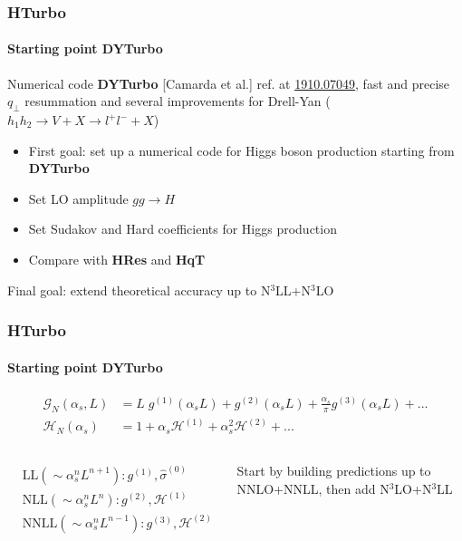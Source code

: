 \documentclass[aspectratio=43]{beamer}
\begin{document}
\begin{frame}

	\frametitle{HTurbo}
	\framesubtitle{Starting point DYTurbo}

	Numerical code \textbf{DYTurbo} {\color{blue}[Camarda et al.]} ref. at {\color{blue} \href{https://arxiv.org/abs/1910.07049}{1910.07049}}, fast and precise $q_{\perp}$ resummation and several improvements for Drell-Yan ($h_{1}h_{2} \rightarrow V + X \rightarrow l^{+}l^{-} + X$) 
	
	\begin{itemize}
		\item {\color{red}First goal}: set up a numerical code for Higgs boson production starting from  \textbf{DYTurbo}
		\item Set LO amplitude $gg \rightarrow H$
		\item Set Sudakov and Hard coefficients for Higgs production
		\item Compare with \textbf{HRes} and \textbf{HqT}
	\end{itemize}

	\vspace{0.5 cm}

	{\color{red}Final goal}: extend theoretical accuracy up to N$^{3}$LL+N$^{3}$LO

\end{frame}

\begin{frame}

	\frametitle{HTurbo}
	\framesubtitle{Starting point DYTurbo}

	\begin{align}
		\mathcal{G}_{N}(\alpha_{s}, L) &= L\;g^{(1)}(\alpha_{s}L) + g^{(2)}(\alpha_{s}L) + \frac{\alpha_{s}}{\pi}g^{(3)}(\alpha_{s}L) + ... \nonumber \\
		\mathcal{H}_{N}(\alpha_{s}) &= 1 + \alpha_{s}\mathcal{H}^{(1)} + \alpha_{s}^{2}\mathcal{H}^{(2)} + ...  \nonumber
	\end{align}
	
	\begin{columns}
		

		\begin{align}
			&\textrm{LL} (\sim \alpha_{s}^{n}L^{n+1}): g^{(1)}, \hat{\sigma}^{(0)} \nonumber \\
			&\textrm{NLL} (\sim \alpha_{s}^{n}L^{n}): g^{(2)}, \mathcal{H}^{(1)} \nonumber \\
			&\textrm{NNLL} (\sim \alpha_{s}^{n}L^{n-1}): g^{(3)}, \mathcal{H}^{(2)} \nonumber
		\end{align}
	
		
		Start by building predictions up to NNLO+NNLL, then add {\color{blue}N$^{3}$LO+N$^{3}$LL}
		
	\end{columns}

\end{frame}
\end{document}
